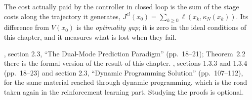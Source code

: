 The cost actually paid by the controller in closed loop is the sum of the stage costs along
the trajectory it generates, $J^{cl}(x_0) = \sum_{k \ge 0} \ell(x_k, \kappa_N(x_k))$. Its
difference from $V(x_0)$ is the \emph{optimality gap}; it is zero in the ideal conditions of
this chapter, and it measures what is lost when they fail.

\begin{reading}
, section 2.3, ``The Dual-Mode Prediction Paradigm'' (pp.~18--21);
Theorem~2.2 there is the formal version of the result of this chapter. ,
sections 1.3.3 and 1.3.4 (pp.~18--23) and section 2.3, ``Dynamic Programming Solution''
(pp.~107--112), for the same material reached through dynamic programming, which is the road
taken again in the reinforcement learning part. Studying the proofs is optional.
\end{reading}
